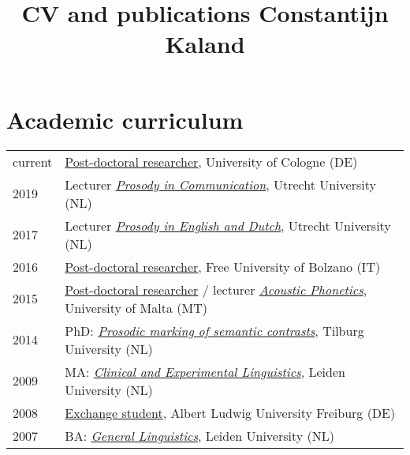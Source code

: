 \documentclass[a4paper,11pt]{article}
\title{CV and publications Constantijn Kaland}
\author{}
\date{}
\begin{document}
\maketitle\vspace{-10mm}

\noindent \section*{Academic curriculum}

\begin{table}[ht!]
\begin{center}
\def\arraystretch{1.5}
\begin{tabular}{p{1.5cm}p{13.5cm}} 
 current & \href{https://sfb1252.uni-koeln.de/en/research-projects/a03-prosodic-prominence-in-cross-linguistic-perspective}{Post-doctoral researcher}, University of Cologne (DE)\\ 
 2019 & Lecturer \href{https://osiris.uu.nl/osiris_student_uuprd/OnderwijsCatalogusSelect.do?selectie=cursus&collegejaar=2018&cursus=EN3V18008}{\textit{Prosody in Communication}}, Utrecht University (NL)\\
2017 & Lecturer \href{https://www.osiris.universiteitutrecht.nl/osistu_ospr/OnderwijsCatalogusSelect.do?selectie=cursus&collegejaar=2016&cursus=EN3V14102}{\textit{Prosody in English and Dutch}}, Utrecht University (NL)\\
2016 & \href{https://alps.projects.unibz.it/}{Post-doctoral researcher}, Free University of Bolzano (IT)\\
2015 & \href{http://page.home.amu.edu.pl/}{Post-doctoral researcher} / lecturer \href{http://www.um.edu.mt/linguistics/studyunit/LIN2099}{\textit{Acoustic Phonetics}}, University of Malta (MT)\\
2014 & PhD: \href{http://www.lotpublications.nl/Documents/366_fulltext.pdf}{\textit{Prosodic marking of semantic contrasts}}, Tilburg University (NL)\\
2009 & MA: \href{https://www.universiteitleiden.nl/en/education/study-programmes/master/linguistics}{\textit{Clinical and Experimental Linguistics}}, Leiden University (NL)\\
2008 & \href{https://ec.europa.eu/programmes/erasmus-plus/opportunities/students_en}{Exchange student}, Albert Ludwig University Freiburg (DE)\\
2007 & BA: \href{https://www.universiteitleiden.nl/en/education/study-programmes/bachelor/linguistics}{\textit{General Linguistics}}, Leiden University (NL)\\
\end{tabular}
\end{center}
\end{table}
\end{document}
